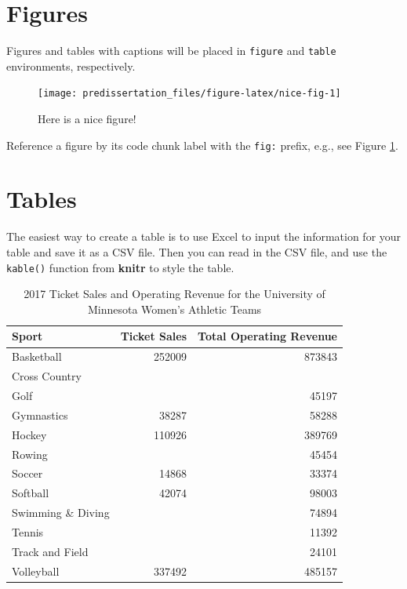 \documentclass[12pt,letterpaper,oneside,oldfontcommands]{memoir}
\theoremstyle{definition}
\theoremstyle{definition}
\theoremstyle{definition}
\theoremstyle{remark}
\begin{document}
\hypertarget{figures}{%
\section{Figures}\label{figures}}

Figures and tables with captions will be placed in \texttt{figure} and
\texttt{table} environments, respectively.

\begin{figure}[H]

{\centering \texttt{[image: predissertation\_files/figure-latex/nice-fig-1]} 

}

\caption{Here is a nice figure!}\label{fig:nice-fig}
\end{figure}

Reference a figure by its code chunk label with the \texttt{fig:}
prefix, e.g., see Figure \ref{fig:nice-fig}.

\hypertarget{tables}{%
\section{Tables}\label{tables}}

The easiest way to create a table is to use Excel to input the
information for your table and save it as a CSV file. Then you can read
in the CSV file, and use the \texttt{kable()} function from
\textbf{knitr} to style the table.

\begin{table}

\caption{\label{tab:nice-tab}2017 Ticket Sales and Operating Revenue for the University of Minnesota Women's Athletic Teams}
\centering
\begin{tabular}[t]{lrr}
\toprule
Sport & Ticket Sales & Total Operating Revenue\\
\midrule
Basketball & 252009 & 873843\\
Cross Country &  & \\
Golf &  & 45197\\
Gymnastics & 38287 & 58288\\
Hockey & 110926 & 389769\\
\addlinespace
Rowing &  & 45454\\
Soccer & 14868 & 33374\\
Softball & 42074 & 98003\\
Swimming \& Diving &  & 74894\\
Tennis &  & 11392\\
\addlinespace
Track and Field &  & 24101\\
Volleyball & 337492 & 485157\\
\bottomrule
\end{tabular}
\end{table}
\end{document}
